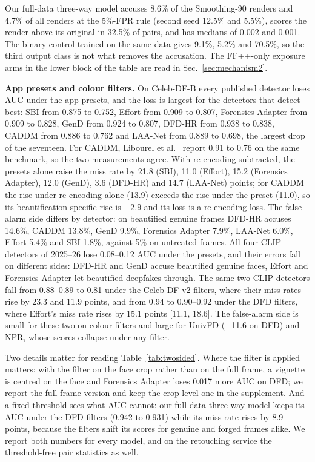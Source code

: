 Our full-data three-way model accuses 8.6\% of the Smoothing-90 renders and 4.7\% of all renders at the 5\%-FPR rule
(second seed 12.5\% and 5.5\%), scores the render above its original in 32.5\% of pairs, and has medians of 0.002 and
0.001. The binary control trained on the same data gives 9.1\%, 5.2\% and 70.5\%, so the third output class is not what
removes the accusation. The FF++-only exposure arms in the lower block of the table are read in
Sec.~\ref{sec:mechanism2}.

\textbf{App presets and colour filters.} On Celeb-DF-B every published detector loses AUC under the app presets, and the
loss is largest for the detectors that detect best: SBI from 0.875 to 0.752, Effort from 0.909 to 0.807, Forensics
Adapter from 0.909 to 0.828, GenD from 0.924 to 0.807, DFD-HR from 0.938 to 0.838, CADDM from 0.886 to 0.762 and
LAA-Net from 0.889 to 0.698, the largest drop of the seventeen. For CADDM, Libourel et al.~\cite{libourel2024} report
0.91 to 0.76 on the same benchmark, so the two measurements agree. With re-encoding subtracted, the presets alone raise
the miss rate by 21.8 (SBI), 11.0 (Effort), 15.2 (Forensics Adapter), 12.0 (GenD), 3.6 (DFD-HR) and 14.7 (LAA-Net)
points; for CADDM the rise under re-encoding alone (13.9) exceeds the rise under the preset (11.0), so its
beautification-specific rise is $-2.9$ and its loss is a re-encoding loss. The false-alarm side differs by detector:
on beautified genuine frames DFD-HR accuses 14.6\%, CADDM 13.8\%, GenD 9.9\%, Forensics Adapter 7.9\%, LAA-Net 6.0\%,
Effort 5.4\% and SBI 1.8\%, against 5\% on untreated frames. All four CLIP detectors of 2025--26 lose 0.08--0.12 AUC
under the presets, and their errors fall on different sides: DFD-HR and GenD accuse beautified genuine faces, Effort and
Forensics Adapter let beautified deepfakes through. The same two CLIP detectors fall from 0.88--0.89 to 0.81 under the
Celeb-DF-v2 filters, where their miss rates rise by 23.3 and 11.9 points, and from 0.94 to 0.90--0.92 under the DFD
filters, where Effort's miss rate rises by 15.1 points [11.1, 18.6]. The false-alarm side is small for these two on
colour filters and large for UnivFD (+11.6 on DFD) and NPR, whose scores collapse under any filter.

Two details matter for reading Table~\ref{tab:twosided}. Where the filter is applied matters: with the filter on the
face crop rather than on the full frame, a vignette is centred on the face and Forensics Adapter loses 0.017 more AUC
on DFD; we report the full-frame version and keep the crop-level one in the supplement. And a fixed threshold sees
what AUC cannot: our full-data three-way model keeps its AUC under the DFD filters (0.942 to 0.931) while its miss rate
rises by 8.9 points, because the filters shift its scores for genuine and forged frames alike. We report both numbers
for every model, and on the retouching service the threshold-free pair statistics as well.
